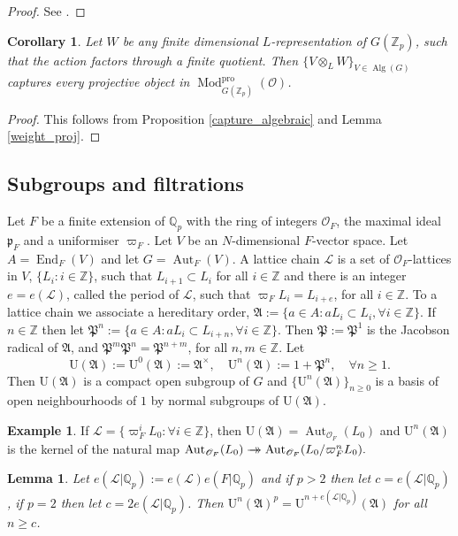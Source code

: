 \documentclass[JEP,XML,SOM,Unicode,NoEqCountersInSection]{cedram}
\let\mathcal\mathscr
\newcommand{\onto}{\mathchoice{\to\hspace*{-5mm}\to}{\to\hspace*{-2.85mm}\to}{\to\hspace*{-3mm}\to}{\to\hspace*{-3mm}\to}}
\newtheorem{lem}[prop]{Lemma}
\newtheorem{cor}[prop]{Corollary}
\theoremstyle{definition}
\newtheorem{examp}[prop]{Example}
\DeclareMathOperator{\Aut}{Aut}
\DeclareMathOperator{\End}{End}
\DeclareMathOperator{\Mod}{Mod}
\DeclareMathOperator{\Alg}{Alg}
\newcommand{\Qp}{\mathbb {Q}_p}
\newcommand{\Zp}{\mathbb{Z}_p}
\newcommand{\ZZ}{\mathbb Z}
\newcommand{\cO}{\mathcal{O}}
\newcommand{\pp}{\mathfrak p}
\newcommand{\pro}{\mathrm{pro}}
\newcommand{\UU}{\mathrm U}
\begin{document}
\begin{proof} See \cite[Prop.\,2.12]{CDP}.
\end{proof}

\begin{cor} Let $W$ be any finite dimensional $L$-representation of $G(\Zp)$, such that the action factors through a finite quotient. Then
$\{V\otimes_L W\}_{V\in \Alg(G)}$ captures every projective object in $\Mod^{\pro}_{G(\Zp)}(\cO)$.
\end{cor}

\begin{proof} This follows from Proposition \ref{capture_algebraic} and Lemma \ref{weight_proj}.
\end{proof}

\subsection{Subgroups and filtrations} Let $F$ be a finite extension of $\Qp$ with the ring of integers $\cO_F$, the maximal ideal
$\pp_F$ and a uniformiser $\varpi_F$. Let $V$ be an $N$-dimensional $F$-vector space.
Let $A=\End_F(V)$ and let $G=\Aut_F(V)$. A lattice chain $\mathcal L$ is a set of $\cO_F$-lattices in $V$, $\{L_i: i\in \ZZ\}$, such that
$L_{i+1}\subset L_i$ for all $i\in \ZZ$ and there is an integer $e=e(\mathcal L)$, called the period of $\mathcal L$, such that $ \varpi_F L_i= L_{i+e}$, for all $i\in \ZZ$.
To a lattice chain we associate a hereditary order,
$\mathfrak A:= \{ a\in A: a L_i\subset L_i, \forall i\in \ZZ\}$. If $n\in \ZZ$ then let $\mathfrak P^n:=\{a\in A: a L_{i} \subset L_{i+n}, \forall i\in \ZZ\}$. Then
$\mathfrak P:=\mathfrak P^1$ is the Jacobson radical of $\mathfrak A$, and $\mathfrak P^m \mathfrak P^n= \mathfrak P^{n+m}$, for all $n, m\in \ZZ$.
Let
\[
\UU(\mathfrak A):=\UU^0(\mathfrak A):=\mathfrak A^{\times}, \quad \UU^n(\mathfrak A):= 1+ \mathfrak P^n, \quad \forall n\ge 1.
\]
Then $\UU(\mathfrak A)$ is a compact open subgroup of $G$ and $\{\UU^n(\mathfrak A)\}_{n\ge 0}$ is a basis of open neighbourhoods of $1$ by normal
subgroups of $\UU(\mathfrak A)$.
\begin{examp}\label{unramified_order} If $\mathcal L=\{ \varpi_F^i L_0: \forall i\in \ZZ\}$, then $\UU(\mathfrak A)=\Aut_{\cO_F}(L_0)$ and $\UU^n(\mathfrak A)$ is the kernel of the
natural map $\Aut_{\cO_F}(L_0)\onto \Aut_{\cO_F}(L_0/\varpi^n_F L_0).$
\end{examp}

\begin{lem}\label{p_power} Let $e(\mathcal L|\Qp):=e(\mathcal L) e(F|\Qp)$ and if $p>2$ then let $c= e(\mathcal L|\Qp)$, if $p=2$ then let $c=2e(\mathcal L|\Qp)$.
Then $\UU^n(\mathfrak A)^p= \UU^{n+e(\mathcal L|\Qp)}(\mathfrak A)$ for all $n\ge c$.
\end{lem}
\end{document}
